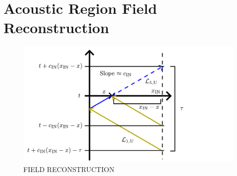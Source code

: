 \section{Acoustic Region Field Reconstruction}

\begin{figure}[t]
\centering
\includegraphics[scale=0.65]{assets/imgs/inlet-adcbc-spatial-field.pdf}
\caption{FIELD RECONSTRUCTION}
\label{fig:field-reconstruction}
\end{figure}


